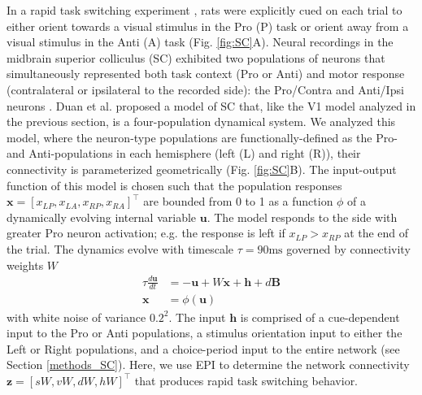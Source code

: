 \documentclass[11pt]{article}
\begin{document}
In a rapid task switching experiment \cite{duan2015requirement}, rats were explicitly cued on each trial to either orient towards a visual stimulus in the Pro (P) task or orient away from a visual stimulus in the Anti (A) task (Fig. \ref{fig:SC}A). 
Neural recordings in the midbrain superior colliculus (SC) exhibited two populations of neurons that simultaneously represented both task context (Pro or Anti) and motor response (contralateral or ipsilateral to the recorded side): the Pro/Contra and Anti/Ipsi neurons \cite{duan2018collicular}.
Duan et al. proposed a model of SC that, like the V1 model analyzed in the previous section, is a four-population dynamical system.  
We analyzed this model, where the neuron-type populations are functionally-defined as the Pro- and Anti-populations in each hemisphere (left (L) and right (R)), their connectivity is parameterized geometrically  (Fig. \ref{fig:SC}B).
The input-output function of this model is chosen such that the population responses $\mathbf{x} = [x_{LP}, x_{LA}, x_{RP}, x_{RA}]^\top$ are bounded from 0 to 1 as a function $\phi$ of a dynamically evolving internal variable $\mathbf{u}$.
The model responds to the side with greater Pro neuron activation; e.g. the response is left if $x_{LP} > x_{RP}$ at the end of the trial.
The dynamics evolve with timescale $\tau= 90\text{ms}$ governed by connectivity weights $W$
\begin{equation}
\begin{split}
\tau \frac{d\mathbf{u}}{dt} &= -\mathbf{u} + W\mathbf{x} + \mathbf{h} + d\mathbf{B} \\
\mathbf{x} &= \phi(\mathbf{u})
\end{split}
\end{equation}
with white noise of variance $0.2^2$.
The input $\mathbf{h}$ is comprised of a cue-dependent input to the Pro or Anti populations, a stimulus orientation input to either the Left or Right populations, and a choice-period input to the entire network (see Section \ref{methods_SC}).
Here, we use EPI to determine the network connectivity $\mathbf{z} = [sW, vW, dW, hW]^{\top}$ that produces rapid task switching behavior.
\end{document}
